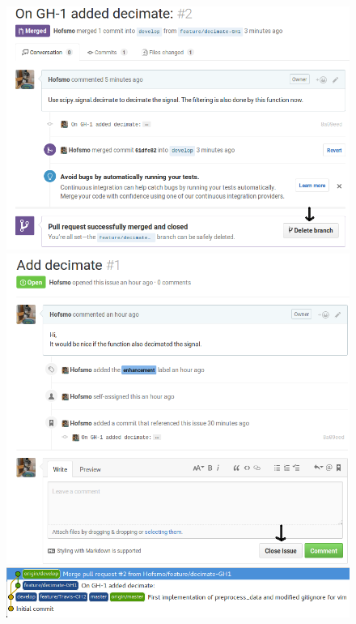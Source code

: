 \begin{frame}
\begin{columns}
\begin{column}{0.6\textwidth}
\begin{figure}
\begin{overprint}
					\includegraphics[width=\textwidth]{./pictures/delete_branch.png}
					\onslide<5>\includegraphics[width=\textwidth]{./pictures/close_issue.png}
					\onslide<6>\includegraphics[width=\textwidth]{./pictures/tree.png}
				\end{overprint}
			\end{figure}
		\end{column}
	\end{columns}
\end{frame}
